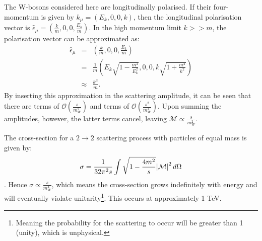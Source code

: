 The W-bosons considered here are longitudinally polarised. If their four-momentum is given by $k_{\mu} = \left( E_{k},0,0,k \right)$, then the longitudinal polarisation vector is $\hat{\epsilon}_{\mu} = \left( \frac{k}{m},0,0,\frac{E_{k}}{m} \right)$. In the high momentum limit $k >> m$, the polarisation vector can be approximated as:
\begin{eqnarray}
\hat{\epsilon}_{\mu} &=& \left( \frac{k}{m},0,0,\frac{E_{k}}{m} \right) \nonumber \\
&=& \frac{1}{m} \left( E_{k} \sqrt{1-\frac{m^{2}}{E_{k}^{2}}},0,0,k\sqrt{1+\frac{m^{2}}{k^{2}}} \right) \nonumber \\
&\approx& \frac{k^{\mu}}{m}.
\end{eqnarray}
By inserting this approximation in the scattering amplitude, it can be seen that there are terms of $\mathcal{O} \left( \frac{s}{m_{W}^{2}} \right)$ and terms of $\mathcal{O} \left( \frac{s^{2}}{m_{W}^{4}} \right)$. Upon summing the amplitudes, however, the latter terms cancel, leaving $\mathcal{M} \propto \frac{s}{m_{W}^{2}}$.

The cross-section for a $2 \longrightarrow 2$ scattering process with particles of equal mass is given by:
\begin{equation}
\sigma = \frac{1}{32 \pi^{2}s} \int \sqrt{1-\frac{4m^{2}}{s}} \abs{\mathcal{M}}^{2} d\Omega
\end{equation} \cite{griffiths}.
Hence $\sigma \propto \frac{s}{m_{W}^{4}}$, which means the cross-section grows indefinitely with energy and will eventually violate unitarity\footnote{Meaning the probability for the scattering to occur will be greater than 1 (unity), which is unphysical.}. This occurs at approximately 1 TeV.

